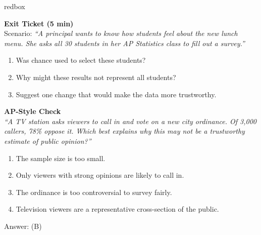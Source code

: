 \documentclass[10pt]{article}
\begin{document}
\begin{skillbox}{redbox}
\begin{minipage}[t]{0.48\linewidth}
    \textbf{Exit Ticket (5 min)}\\
    Scenario: \textit{``A principal wants to know how students feel about the new lunch
    menu. She asks all 30 students in her AP Statistics class to fill out a survey.''}
    \begin{enumerate}
        \item Was chance used to select these students?
        \item Why might these results not represent all students?
        \item Suggest one change that would make the data more trustworthy.
    \end{enumerate}
\end{minipage}
\hfill
\begin{minipage}[t]{0.48\linewidth}
    \textbf{AP-Style Check}\\
    \textit{``A TV station asks viewers to call in and vote on a new city ordinance.
    Of 3{,}000 callers, 78\% oppose it. Which best explains why this may not be a
    trustworthy estimate of public opinion?''}
    \begin{enumerate}[label=(\Alph*)]
        \item The sample size is too small.
        \item Only viewers with strong opinions are likely to call in.
        \item The ordinance is too controversial to survey fairly.
        \item Television viewers are a representative cross-section of the public.
    \end{enumerate}
    Answer: (B)
\end{minipage}
\end{skillbox}
\end{document}
